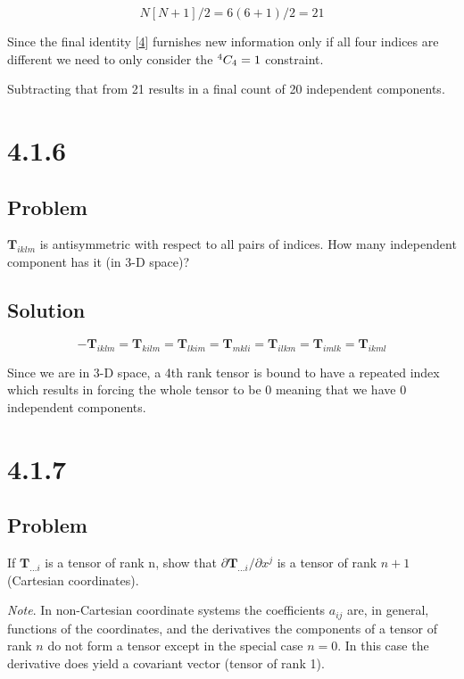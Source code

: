 \documentclass[12pt]{article}
\begin{document}
\[
    N[N+1]/2 = 6(6+1)/2 = 21
\]

Since the final identity [\hyperref[e4]{4}] furnishes new information only if all four indices are different we need to only
consider the \({}^{4} C_{4} = 1\) constraint.

Subtracting that from 21 results in a final count of 20 independent components.

\newpage
\section{4.1.6}

\subsection{Problem}

\(\textbf{T}_{iklm}\) is antisymmetric with respect to all pairs of indices. How many
independent component has it (in 3-D space)?

\subsection{Solution}

\[
    - \textbf{T}_{iklm}
    = \textbf{T}_{kilm}
    = \textbf{T}_{lkim}
    = \textbf{T}_{mkli}
    = \textbf{T}_{ilkm}
    = \textbf{T}_{imlk}
    = \textbf{T}_{ikml}
\]

Since we are in 3-D space, a 4th rank tensor is bound to have a repeated index which results in
forcing the whole tensor to be 0 meaning that we have 0 independent components.

\newpage
\section{4.1.7}

\subsection{Problem}

If \(\textbf{T}_{\ldots i}\) is a tensor of rank n, show that
\(\partial \textbf{T}_{\ldots i} / \partial x^j\) is a tensor of rank \(n + 1\)
(Cartesian coordinates).

\textit{Note}. In non-Cartesian coordinate systems the coefficients \(a_{ij}\) are, in general,
functions of the coordinates, and the derivatives the components of a tensor of rank \(n\) do
not form a tensor except in the special case \(n = 0\). In this case the derivative does yield a
covariant vector (tensor of rank 1).
\end{document}
